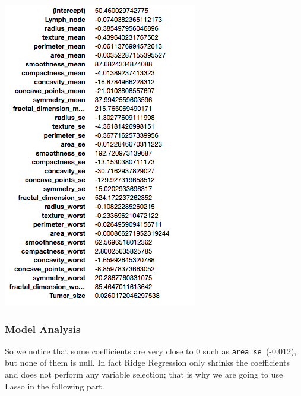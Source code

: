 \documentclass[]{report}
\begin{document}
\begin{center}
	\includegraphics[width=0.8\linewidth]{Figures/ridge_coeff}
\end{center}

\subsubsection{Model Analysis}
So we notice that some coefficients are very close to 0 such as \texttt{area\_se }(-0.012), but none of them is null. In fact Ridge Regression only shrinks the coefficients and does not perform any variable selection;  that is why we are going to use Lasso in the following part.
\end{document}
